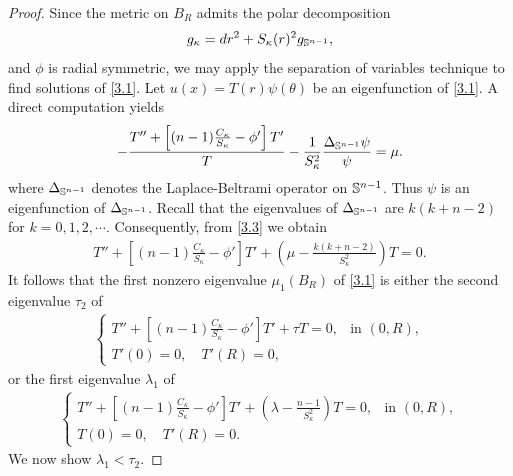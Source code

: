 \documentclass[10pt,a4paper]{amsart}
\def\S{\Bbb S}
\def\k{\kappa}
\def\l{\lambda}
\begin{document}
\begin{proof}
Since the  metric on $B_R$ admits  the polar decomposition $$g_\k=dr^2+S_\k(r)^2 g_{\S^{n-1}},$$  and $\phi$ is radial symmetric, we may apply the separation of variables
technique to find solutions of \eqref{3.1}. 
Let $u(x)=T(r)\psi(\theta)$ be an eigenfunction of \eqref{3.1}. A   direct computation yields
\begin{align}\label{3.3}
   -\frac{T'' + \left[(n-1)\frac{C_\kappa}{S_\kappa} - \phi'\right]T'}{T} -\frac 1 {S_\k^2}\frac{\Delta_{\S^{n-1}}\psi}{\psi}=\mu.
\end{align}
where $\Delta_{\S^{n-1}}$ denotes the  Laplace-Beltrami operator  on $\S^{n-1}$. Thus $\psi$ is an eigenfunction of $\Delta_{\S^{n-1}}$.
Recall that  the eigenvalues of $\Delta_{\S^{n-1}}$ are $k(k+n-2)$  for $k=0, 1, 2, \cdots$. Consequently, from  \eqref{3.3} we obtain 
\begin{align*} 
T'' + \left[(n-1)\frac{C_\kappa}{S_\kappa} - \phi'\right]T' + \left(\mu - \frac{k(k+n-2)}{S_\kappa^2}\right)T = 0.
\end{align*}
It follows that the first nonzero eigenvalue $\mu_1(B_R)$ of  \eqref{3.1}  is either the second eigenvalue $\tau_2$ of
 \begin{align}
     \begin{cases}\label{3.4}
T'' + \left[(n-1)\frac{C_\kappa}{S_\kappa} - \phi'\right]T'+ \tau T = 0, & \text{in } (0,R),\\
T'(0) = 0,\quad T'(R)  = 0,
\end{cases}
 \end{align}
or the first eigenvalue $\l_1$ of 
\begin{align}\label{3.5}
    \begin{cases}
T'' + \left[(n-1)\frac{C_\kappa}{S_\kappa} - \phi'\right]T'+ (\l-\frac{n-1}{S_\k^2})T=0, & \text{in } (0,R),\\
T(0) = 0,\quad T'(R) = 0.
\end{cases}
\end{align}
We now show $\l_1<\tau_2$.


\end{proof}
\end{document}
